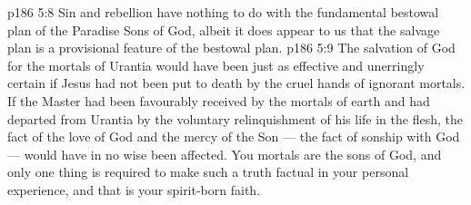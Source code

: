 \vs p186 5:8 Sin and rebellion have nothing to do with the fundamental bestowal plan of the Paradise Sons of God, albeit it does appear to us that the salvage plan is a provisional feature of the bestowal plan.
\vs p186 5:9 The salvation of God for the mortals of Urantia would have been just as effective and unerringly certain if Jesus had not been put to death by the cruel hands of ignorant mortals. If the Master had been favourably received by the mortals of earth and had departed from Urantia by the voluntary relinquishment of his life in the flesh, the fact of the love of God and the mercy of the Son --- the fact of sonship with God --- would have in no wise been affected. You mortals are the sons of God, and only one thing is required to make such a truth factual in your personal experience, and that is your spirit\hyp{}born faith.
\quizlink
